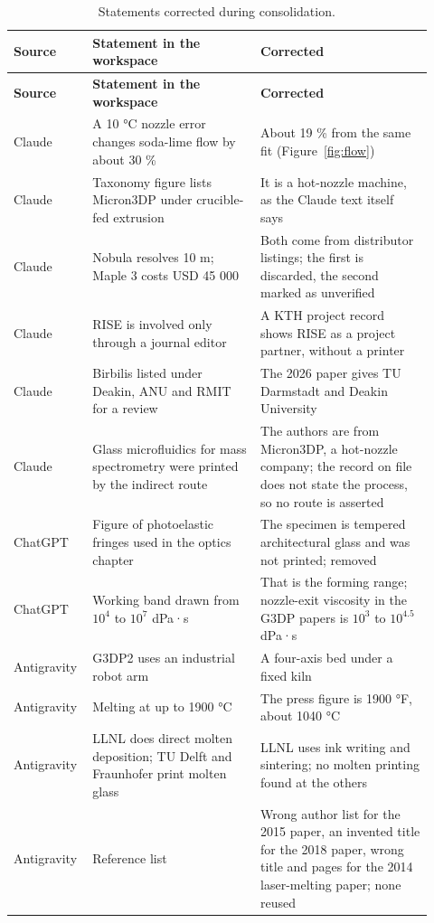 \documentclass[10pt,a4paper]{article}
\begin{document}
{\footnotesize
\begin{longtable}{@{}L{0.135\linewidth}L{0.386\linewidth}L{0.395\linewidth}@{}}
  \caption{Statements corrected during consolidation.}\label{tbl:corrections}\\
  \toprule
  \textbf{Source} & \textbf{Statement in the workspace} & \textbf{Corrected} \\
  \midrule
  \endfirsthead
  \toprule
  \textbf{Source} & \textbf{Statement in the workspace} & \textbf{Corrected} \\
  \midrule
  \endhead
    Claude & A 10 °C nozzle error changes soda-lime flow by about 30 \% & About 19 \% from the same fit (Figure~\ref{fig:flow}) \\
    Claude & Taxonomy figure lists Micron3DP under crucible-fed extrusion & It is a hot-nozzle machine, as the Claude text itself says \\
    Claude & Nobula resolves 10 \textmu{}m; Maple 3 costs USD 45 000 & Both come from distributor listings; the first is discarded, the second marked as unverified \\
    Claude & RISE is involved only through a journal editor & A KTH project record shows RISE as a project partner, without a printer \\
    Claude & Birbilis listed under Deakin, ANU and RMIT for a review & The 2026 paper gives TU Darmstadt and Deakin University \\
    Claude & Glass microfluidics for mass spectrometry were printed by the indirect route & The authors are from Micron3DP, a hot-nozzle company; the record on file does not state the process, so no route is asserted \\
    ChatGPT & Figure of photoelastic fringes used in the optics chapter & The specimen is tempered architectural glass and was not printed; removed \\
    ChatGPT & Working band drawn from $10^{4}$ to $10^{7}$ dPa·s & That is the forming range; nozzle-exit viscosity in the G3DP papers is $10^{3}$ to $10^{4.5}$ dPa·s \\
    Antigravity & G3DP2 uses an industrial robot arm & A four-axis bed under a fixed kiln \\
    Antigravity & Melting at up to 1900 °C & The press figure is 1900 °F, about 1040 °C \\
    Antigravity & LLNL does direct molten deposition; TU Delft and Fraunhofer print molten glass & LLNL uses ink writing and sintering; no molten printing found at the others \\
    Antigravity & Reference list & Wrong author list for the 2015 paper, an invented title for the 2018 paper, wrong title and pages for the 2014 laser-melting paper; none reused \\
  \bottomrule
\end{longtable}
}
\end{document}
